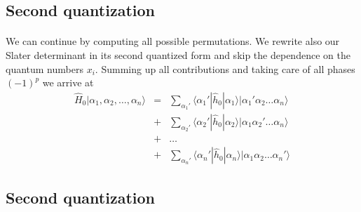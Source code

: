 \documentclass[%
twoside,                 %
final,                   %
10pt]{article}
\begin{document}
\subsection*{Second quantization}

\paragraph{}
We can continue by computing all possible permutations. 
We rewrite also our Slater determinant in its second quantized form and skip the dependence on the quantum numbers $x_i.$
Summing up all contributions and taking care of all phases
$(-1)^p$ we arrive at 
\begin{eqnarray}
	\hat{H}_0|\alpha_1,\alpha_2,\dots, \alpha_n\rangle &=& \sum_{\alpha_1'}\langle \alpha_1'|\hat{h}_0|\alpha_1\rangle
		|\alpha_1'\alpha_2 \dots \alpha_{n}\rangle \nonumber \\
	&+& \sum_{\alpha_2'} \langle \alpha_2'|\hat{h}_0|\alpha_2\rangle
		|\alpha_1\alpha_2' \dots \alpha_{n}\rangle \nonumber \\
	&+& \dots \nonumber \\
	&+& \sum_{\alpha_n'} \langle \alpha_n'|\hat{h}_0|\alpha_n\rangle
		|\alpha_1\alpha_2 \dots \alpha_{n}'\rangle \label{eq:2-28}
\end{eqnarray}




\subsection*{Second quantization}

\end{document}
